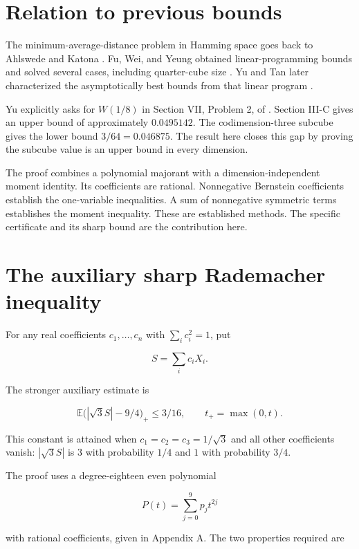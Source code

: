 \documentclass[11pt]{article}
\begin{document}
\section{Relation to previous bounds}

The minimum-average-distance problem in Hamming space goes back to Ahlswede and Katona \cite{AK77}. Fu, Wei, and Yeung obtained linear-programming bounds and solved several cases, including quarter-cube size \cite{FWY01}. Yu and Tan later characterized the asymptotically best bounds from that linear program \cite{YT19}.

Yu explicitly asks for $W(1/8)$ in Section VII, Problem 2, of \cite{Y26}. Section III-C gives an upper bound of approximately $0.0495142$. The codimension-three subcube gives the lower bound $3/64=0.046875$. The result here closes this gap by proving the subcube value is an upper bound in every dimension.

The proof combines a polynomial majorant with a dimension-independent moment identity. Its coefficients are rational. Nonnegative Bernstein coefficients establish the one-variable inequalities. A sum of nonnegative symmetric terms establishes the moment inequality. These are established methods. The specific certificate and its sharp bound are the contribution here.

\hypertarget{the-auxiliary-sharp-rademacher-inequality}{%
\section{The auxiliary sharp Rademacher
inequality}\label{the-auxiliary-sharp-rademacher-inequality}}

For any real coefficients \(c_1,\ldots,c_n\) with \(\sum_i c_i^2=1\),
put

\[S=\sum_i c_iX_i.\]

The stronger auxiliary estimate is

\[\mathbb E\bigl(|\sqrt3 S|-9/4\bigr)_+\le3/16,\qquad t_+=\max(0,t). \tag{3}\]

This constant is attained when \(c_1=c_2=c_3=1/\sqrt3\) and all other
coefficients vanish: \(|\sqrt3S|\) is \(3\) with probability \(1/4\) and
\(1\) with probability \(3/4\).

The proof uses a degree-eighteen even polynomial

\[P(t)=\sum_{j=0}^9p_jt^{2j} \tag{4}\]

with rational coefficients, given in Appendix A. The two properties
required are
\end{document}
